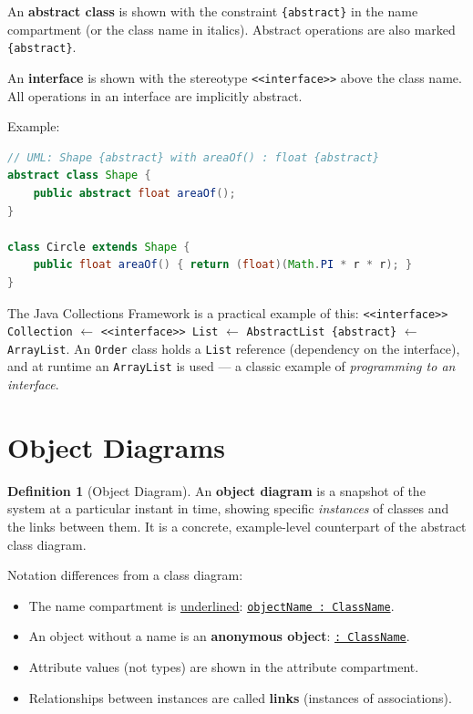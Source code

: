 \documentclass[11pt, a4paper, notitlepage]{report}
\theoremstyle{definition}
\newtheorem{definition}[theorem]{Definition}
\theoremstyle{remark}
\theoremstyle{definition}
\begin{document}
An \textbf{abstract class} is shown with the constraint \texttt{\{abstract\}}
in the name compartment (or the class name in italics).  Abstract operations
are also marked \texttt{\{abstract\}}.

An \textbf{interface} is shown with the stereotype \texttt{<<interface>>}
above the class name.  All operations in an interface are implicitly abstract.

Example:

\begin{lstlisting}[language=Java]
// UML: Shape {abstract} with areaOf() : float {abstract}
abstract class Shape {
    public abstract float areaOf();
}

class Circle extends Shape {
    public float areaOf() { return (float)(Math.PI * r * r); }
}
\end{lstlisting}

The Java Collections Framework is a practical example of this:
\texttt{<<interface>> Collection} $\leftarrow$ \texttt{<<interface>> List}
$\leftarrow$ \texttt{AbstractList \{abstract\}} $\leftarrow$
\texttt{ArrayList}.  An \texttt{Order} class holds a \texttt{List} reference
(dependency on the interface), and at runtime an \texttt{ArrayList} is used ---
a classic example of \emph{programming to an interface}.

\section{Object Diagrams}
\label{sec:ch6-object-diagram}

\begin{definition}[Object Diagram]
\label{def:ch6-object-diagram}
An \textbf{object diagram} is a snapshot of the system at a particular
instant in time, showing specific \emph{instances} of classes and the
links between them.  It is a concrete, example-level counterpart of the
abstract class diagram.
\end{definition}

Notation differences from a class diagram:

\begin{itemize}[noitemsep]
  \item The name compartment is \underline{underlined}:
        \texttt{\underline{objectName : ClassName}}.
  \item An object without a name is an \textbf{anonymous object}:
        \texttt{\underline{: ClassName}}.
  \item Attribute values (not types) are shown in the attribute compartment.
  \item Relationships between instances are called \textbf{links} (instances
        of associations).
\end{itemize}
\end{document}
